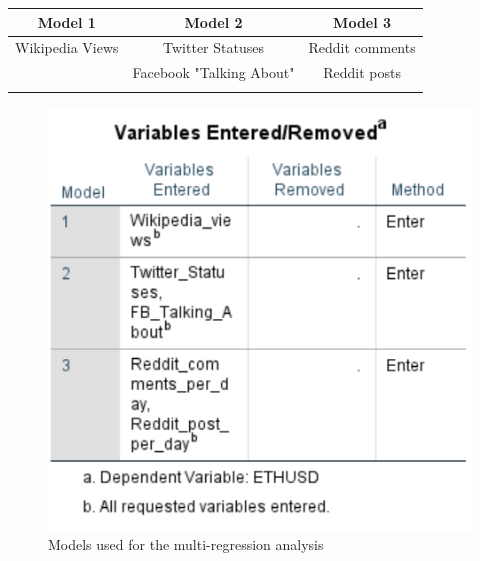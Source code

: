 \documentclass[11pt]{report}
\begin{document}
\begin{table}[!h]
\centering
\begin{tabular}{ccc}
Model 1                               & Model 2                                       & Model 3                              \\ \hline
\multicolumn{1}{|c|}{Wikipedia Views} & \multicolumn{1}{c|}{Twitter Statuses}         & \multicolumn{1}{c|}{Reddit comments} \\ \hline
\multicolumn{1}{c|}{}                 & \multicolumn{1}{c|}{Facebook "Talking About"} & \multicolumn{1}{c|}{Reddit posts}    \\ \cline{2-3} 
\multicolumn{1}{l}{}                  & \multicolumn{1}{l}{}                          & \multicolumn{1}{l}{}                
\end{tabular}
\end{table}
\medbreak
\begin{figure}[!h]
\centering
\includegraphics[scale=1]{Chap5/VariableSocial}
\caption{Models used for the multi-regression analysis}
\end{figure}
\clearpage
\end{document}
